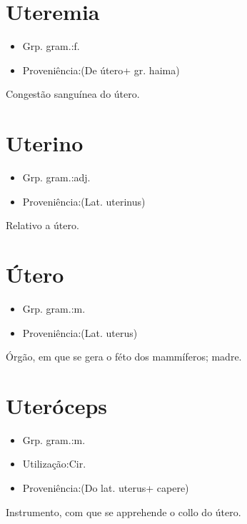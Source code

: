 \documentclass{article}
\begin{document}
\section{Uteremia}
\begin{itemize}
\item {Grp. gram.:f.}
\end{itemize}
\begin{itemize}
\item {Proveniência:(De \textunderscore útero\textunderscore  + gr. \textunderscore haima\textunderscore )}
\end{itemize}
Congestão sanguínea do útero.
\section{Uterino}
\begin{itemize}
\item {Grp. gram.:adj.}
\end{itemize}
\begin{itemize}
\item {Proveniência:(Lat. \textunderscore uterinus\textunderscore )}
\end{itemize}
Relativo a útero.
\section{Útero}
\begin{itemize}
\item {Grp. gram.:m.}
\end{itemize}
\begin{itemize}
\item {Proveniência:(Lat. \textunderscore uterus\textunderscore )}
\end{itemize}
Órgão, em que se gera o féto dos mammíferos; madre.
\section{Uteróceps}
\begin{itemize}
\item {Grp. gram.:m.}
\end{itemize}
\begin{itemize}
\item {Utilização:Cir.}
\end{itemize}
\begin{itemize}
\item {Proveniência:(Do lat. \textunderscore uterus\textunderscore  + \textunderscore capere\textunderscore )}
\end{itemize}
Instrumento, com que se apprehende o collo do útero.
\end{document}
